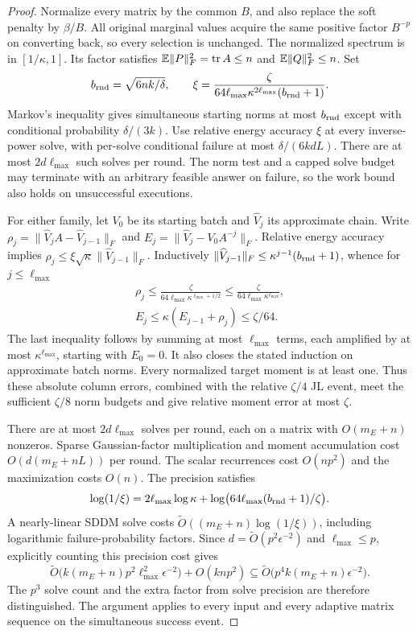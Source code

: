 \begin{proof}
Normalize every matrix by the common $B$, and also replace the
soft penalty by $\beta/B$. All original marginal values acquire
the same positive factor $B^{-p}$ on converting back, so every
selection is unchanged. The normalized spectrum is in
$[1/\kappa,1]$. Its factor satisfies
$\mathbb E\|P\|_F^2=\operatorname{tr} A\leq n$ and $\mathbb E\|Q\|_F^2\leq n$.
Set
\begin{equation}\label{eq:freshprecision}
 b_{\rm rnd}=\sqrt{6nk/\delta},\qquad
 \xi=\frac{\zeta}{64\ell_{\max}\kappa^{2\ell_{\max}}(b_{\rm rnd}+1)}.
\end{equation}
Markov's inequality gives simultaneous starting norms at most $b_{\rm rnd}$
except with conditional probability $\delta/(3k)$. Use relative
energy accuracy $\xi$ at every inverse-power solve, with per-solve
conditional failure at most $\delta/(6kdL)$. There are at most
$2d\ell_{\max}$ such solves per round. The norm test and a capped solve budget
may terminate with an arbitrary feasible answer on failure, so the
work bound also holds on unsuccessful executions.

For either family, let $V_0$ be its starting batch and $\widehat V_j$
its approximate chain. Write $\rho_j=\|\widehat V_j A-
\widehat V_{j-1}\|_F$ and
$E_j=\|\widehat V_j-V_0A^{-j}\|_F$. Relative energy accuracy
implies $\rho_j\leq\xi\sqrt\kappa\|\widehat V_{j-1}\|_F$.
Inductively $\|\widehat V_{j-1}\|_F\leq
\kappa^{j-1}(b_{\rm rnd}+1)$, whence for $j\leq \ell_{\max}$
\begin{gather*}
 \rho_j\leq\frac{\zeta}{64\ell_{\max}\kappa^{\ell_{\max}+1/2}}
 \leq\frac{\zeta}{64\ell_{\max}\kappa^{\ell_{\max}}},\\
 E_j\leq\kappa(E_{j-1}+\rho_j)\leq\zeta/64.
\end{gather*}
The last inequality follows by summing at most $\ell_{\max}$ terms, each
amplified by at most $\kappa^{\ell_{\max}}$, starting with $E_0=0$.
It also closes the stated induction on approximate batch norms.
Every normalized target moment is at least one. Thus these
absolute column errors, combined with the relative $\zeta/4$
JL event, meet the sufficient $\zeta/8$ norm budgets and give
relative moment error at most $\zeta$.

There are at most $2d\ell_{\max}$ solves per round, each on a matrix with
$O(m_E+n)$ nonzeros. Sparse Gaussian-factor multiplication and
moment accumulation cost $O(d(m_E+nL))$ per round. The scalar
recurrences cost $O(np^2)$ and the maximization costs $O(n)$.
The precision satisfies
\[
 \log(1/\xi)=2\ell_{\max}\log\kappa+
       \log\bigl(64\ell_{\max}(b_{\rm rnd}+1)/\zeta\bigr).
\]
A nearly-linear SDDM solve costs
$\widetilde O((m_E+n)\log(1/\xi))$, including logarithmic
failure-probability factors. Since $d=\widetilde O(p^2\epsilon^{-2})$
and $\ell_{\max}\leq p$, explicitly counting this precision cost gives
\[
 \widetilde O\bigl(k(m_E+n)p^2\ell_{\max}^2\epsilon^{-2}\bigr)
       +O(knp^2)
 \subseteq\widetilde O\bigl(p^4k(m_E+n)\epsilon^{-2}\bigr).
\]
The $p^3$ solve count and the extra factor from solve precision are
therefore distinguished. The argument applies to every input and
every adaptive matrix sequence on the simultaneous success event.
\end{proof}



